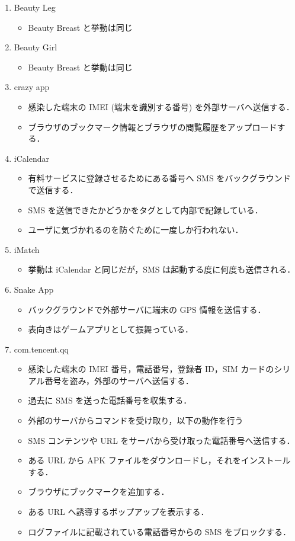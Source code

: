 \begin{enumerate}
\item Beauty Leg
	\begin{itemize}
	\item Beauty Breast と挙動は同じ
	\end{itemize}

\item Beauty Girl
	\begin{itemize}
	\item Beauty Breast と挙動は同じ
	\end{itemize}

\item crazy app
	\begin{itemize}
	\item 感染した端末の IMEI (端末を識別する番号) を外部サーバへ送信する．
	\item  ブラウザのブックマーク情報とブラウザの閲覧履歴をアップロードする．
	\end{itemize}
\item iCalendar
	\begin{itemize}
	\item 有料サービスに登録させるためにある番号へ SMS をバックグラウンドで送信する．
	\item SMS  を送信できたかどうかをタグとして内部で記録している．
	\item ユーザに気づかれるのを防ぐために一度しか行われない．
	\end{itemize}
	
\item iMatch
	\begin{itemize}
	\item 挙動は iCalendar と同じだが，SMS は起動する度に何度も送信される．
	\end{itemize}
	
\item Snake App
	\begin{itemize}
	\item バックグラウンドで外部サーバに端末の GPS 情報を送信する．
	\item 表向きはゲームアプリとして振舞っている．
	\end{itemize}
	

\item com.tencent.qq
	\begin{itemize}
	\item 感染した端末の IMEI 番号，電話番号，登録者 ID，SIM カードのシリアル番号を盗み，外部のサーバへ送信する．
	\item 過去に SMS を送った電話番号を収集する．
	\item 外部のサーバからコマンドを受け取り，以下の動作を行う
	\item SMS コンテンツや URL をサーバから受け取った電話番号へ送信する．
	\item ある URL から APK ファイルをダウンロードし，それをインストールする．
	\item ブラウザにブックマークを追加する．
	\item ある URL へ誘導するポップアップを表示する．
	\item ログファイルに記載されている電話番号からの SMS をブロックする．
	\end{itemize}
\end{enumerate}

